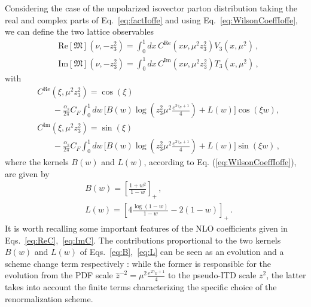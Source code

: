 Considering the case of the unpolarized isovector parton distribution 
taking the real and complex parts of Eq.~\eqref{eq:factIoffe} and using Eq.~\eqref{eq:WilsonCoeffIoffe}, 
we can define the two lattice observables
\begin{align}
	\label{eq:Reppdf}
    &\text{Re}\left[\mathfrak{M}\right]\left(\nu, -z_3^2\right) 
    = \int_{0}^{1} dx\,C^{\text{Re}}\left(x\nu,\mu^2 z_3^2\right)V_3\left(x,\mu^2\right)\, ,\\
	\label{eq:Imppdf}
    &\text{Im}\left[\mathfrak{M}\right]\left(\nu, -z_3^2\right) 
    = \int_{0}^{1} dx\,C^{\text{Im}}\left(x\nu,\mu^2 z_3^2\right)T_3\left(x,\mu^2\right)\, ,
\end{align}
with
\begin{align}
	\label{eq:ReC}
	&C^{\text{Re}}\left(\xi,\mu^2 z_3^2\right) 
    = \cos\left(\xi\right) \nonumber\\
    &\,\,\,\,\,\,\,\,\,\,\,-\frac{\alpha_s}{2\pi} C_F \int_0^1 dw \, \biggl[B\left(w\right) 
    \log\left(z_3^2\mu^2\frac{e^{2\gamma_E + 1}}{4}\right) + L\left(w\right)\biggr] \cos\left(\xi w\right), \\
    \label{eq:ImC}
	&C^{\text{Im}}\left(\xi,\mu^2 z_3^2\right) 
    = \sin\left(\xi\right) \nonumber\\
    &\,\,\,\,\,\,\,\,\,\,\,-\frac{\alpha_s}{2\pi} C_F \int_0^1 dw \, \biggl[B\left(w\right)
    \log\left(z_3^2\mu^2\frac{e^{2\gamma_E + 1}}{4}\right)  + L\left(w\right)\biggr] \sin\left(\xi w\right)\, ,
\end{align}
where the kernels $B\left(w\right)$ and $L\left(w\right)$, 
according to Eq. (\ref{eq:WilsonCoeffIoffe}), are given by 
\begin{align}
    \label{eq:B}
    &B\left(w\right) = \left[\frac{1+w^2}{1-w}\right]_+ \, ,\\
    \label{eq:L}
    &L\left(w\right) = \left[4\frac{\log\left(1-w\right)}{1-w} -2\left(1-w\right)\right]_+ \, .
\end{align}
It is worth recalling some important features of the NLO coefficients given in Eqs.~\eqref{eq:ReC},~\eqref{eq:ImC}.
The contributions proportional to the two kernels $B\left(w\right)$ and $L\left(w\right)$ of Eqs.~\eqref{eq:B},~\eqref{eq:L} 
can be seen as an evolution and a scheme change term respectively \cite{Joo:2019jct,Radyushkin:2018cvn}: 
while the former is responsible for the evolution from the PDF scale 
$\hat{z}^{-2} = \mu^2\frac{e^{2\gamma_E + 1}}{4} $ to the pseudo-ITD scale $z^2$, the latter takes into
account the finite terms characterizing the specific choice of the renormalization scheme. 
